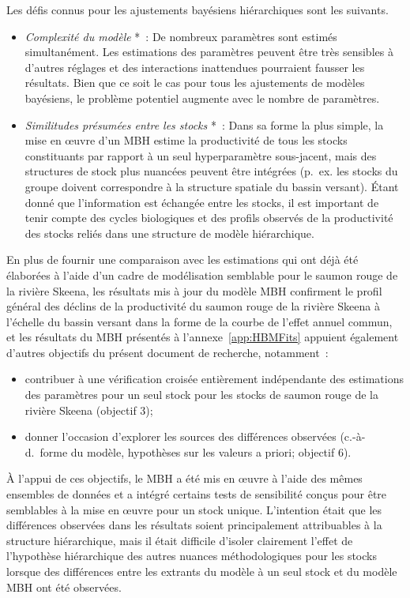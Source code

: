 \documentclass[french,11pt]{book}
\begin{document}
Les défis connus pour les ajustements bayésiens hiérarchiques sont les suivants.
\begin{itemize}

\item
  \emph{Complexité du modèle} *~: De nombreux paramètres sont estimés simultanément. Les estimations des paramètres peuvent être très sensibles à d'autres réglages et des interactions inattendues pourraient fausser les résultats. Bien que ce soit le cas pour tous les ajustements de modèles bayésiens, le problème potentiel augmente avec le nombre de paramètres.
\item
  \emph{Similitudes présumées entre les stocks} *~: Dans sa forme la plus simple, la mise en œuvre d'un MBH estime la productivité de tous les stocks constituants par rapport à un seul hyperparamètre sous-jacent, mais des structures de stock plus nuancées peuvent être intégrées (p.~ex. les stocks du groupe doivent correspondre à la structure spatiale du bassin versant). Étant donné que l'information est échangée entre les stocks, il est important de tenir compte des cycles biologiques et des profils observés de la productivité des stocks reliés dans une structure de modèle hiérarchique.
\end{itemize}
En plus de fournir une comparaison avec les estimations qui ont déjà été élaborées à l'aide d'un cadre de modélisation semblable pour le saumon rouge de la rivière Skeena, les résultats mis à jour du modèle MBH confirment le profil général des déclins de la productivité du saumon rouge de la rivière Skeena à l'échelle du bassin versant dans la forme de la courbe de l'effet annuel commun, et les résultats du MBH présentés à l'annexe~\ref{app:HBMFits} appuient également d'autres objectifs du présent document de recherche, notamment~:
\begin{itemize}

\item
  contribuer à une vérification croisée entièrement indépendante des estimations des paramètres pour un seul stock pour les stocks de saumon rouge de la rivière Skeena (objectif 3);
\item
  donner l'occasion d'explorer les sources des différences observées (c.-à-d.~forme du modèle, hypothèses sur les valeurs a priori; objectif 6).
\end{itemize}
À l'appui de ces objectifs, le MBH a été mis en œuvre à l'aide des mêmes ensembles de données et a intégré certains tests de sensibilité conçus pour être semblables à la mise en œuvre pour un stock unique. L'intention était que les différences observées dans les résultats soient principalement attribuables à la structure hiérarchique, mais il était difficile d'isoler clairement l'effet de l'hypothèse hiérarchique des autres nuances méthodologiques pour les stocks lorsque des différences entre les extrants du modèle à un seul stock et du modèle MBH ont été observées.
\end{document}
